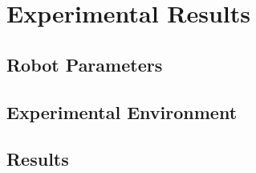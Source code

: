 \documentclass[journal]{IEEEtran}
\begin{document}
\section{Experimental Results}
\subsection{Robot Parameters}
\subsection{Experimental Environment}
\subsection{Results}


%


\end{document}
